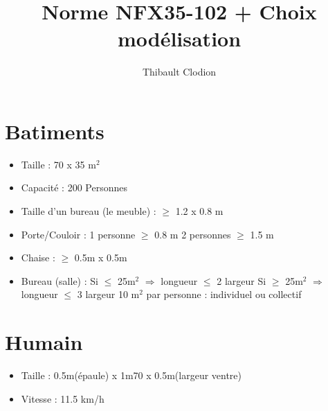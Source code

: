 \documentclass[12pt]{article}
\title{Norme NFX35-102 + Choix modélisation}
\author{Thibault Clodion}
\begin{document}
\maketitle %

\section{Batiments}

\begin{itemize}

\item Taille : 70 x 35  m$^2$

\item Capacité : 200 Personnes

\item Taille d'un bureau (le meuble) : $\geq$ 1.2 x 0.8 m 

\item Porte/Couloir : 
    \newline \hspace*{0.2cm} 1 personne $\geq$ 0.8 m
    \newline \hspace*{0.2cm} 2 personnes $\geq$ 1.5 m

\item Chaise : $\geq$ 0.5m x 0.5m
\item Bureau (salle) :
    \newline \hspace*{0.2cm} Si $\leq$ 25m$^2$ $\Rightarrow$  longueur $\leq$ 2 largeur
    \newline \hspace*{0.2cm} Si $\geq$ 25m$^2$ $\Rightarrow$  longueur $\leq$ 3 largeur
    \newline \hspace*{0.2cm} 10 m$^2$ par personne : individuel ou collectif

\end{itemize}

\section{Humain}

\begin{itemize}

    \item Taille : 0.5m(épaule) x 1m70 x 0.5m(largeur ventre)
    \item Vitesse : 11.5 km/h
\end{itemize}
\end{document}
